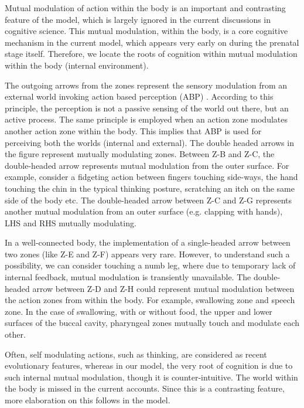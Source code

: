 Mutual modulation of action within the body is an important and contrasting feature of the model, which is largely ignored in the current discussions in cognitive science. This mutual modulation, within the body, is a core cognitive mechanism in the current model, which appears very early on during the prenatal stage itself. Therefore, we locate the roots of cognition within mutual modulation within the body (internal environment).

The outgoing arrows from the zones represent the sensory modulation from an external world invoking action based perception (ABP) \cite{noe_action_2004}. According to this principle, the perception is not a passive sensing of the world out there, but an active process. The same principle is employed when an action zone modulates another action zone within the body. This implies that ABP is used for perceiving both the worlds (internal and external). The double headed arrows in the figure represent mutually modulating zones. Between Z-B and Z-C, the double-headed arrow represents mutual modulation from the outer surface. For example, consider a fidgeting action between fingers touching side-ways, the hand touching the chin in the typical thinking posture, scratching an itch on the same side of the body etc. The double-headed arrow between Z-C and Z-G represents another mutual modulation from an outer surface (e.g. clapping with hands), LHS and RHS mutually modulating.

In a well-connected body, the implementation of a single-headed arrow between two zones (like Z-E and Z-F) appears very rare. However, to understand such a possibility, we can consider touching a numb leg, where due to temporary lack of internal feedback, mutual modulation is transiently unavailable. The double-headed arrow between Z-D and Z-H could represent mutual modulation between the action zones from within the body. For example, swallowing zone and speech zone. In the case of swallowing, with or without food, the upper and lower surfaces of the buccal cavity, pharyngeal zones mutually touch and modulate each other.

Often, self modulating actions, such as thinking, are considered as recent evolutionary features, whereas in our model, the very root of cognition is due to such internal mutual modulation, though it is counter-intuitive. The world within the body is missed in the current accounts. Since this is a contrasting feature, more elaboration on this follows in the model. 


